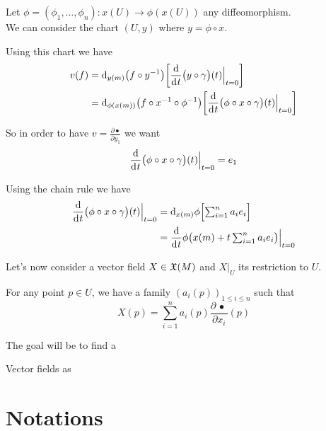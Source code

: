 		Let $\phi = (\phi_1, \ldots, \phi_n): x(U) \to \phi(x(U))$ any diffeomorphism.\\
		We can consider the chart $(U, y)$ where $y = \phi \circ x$.

		Using this chart we have
		\begin{align*}
			v(f) &= \di[y(m)] \big( f \circ y^{-1} \big) \bigg[ \frac{\d}{\di{t}} \big( y \circ \gamma \big)(t) \Big|_{t=0} \bigg] \\
			     &= \di[\phi(x(m))] \big( f \circ x^{-1} \circ \phi^{-1} \big) \bigg[ \frac{\d}{\di{t}} \big( \phi \circ x \circ \gamma \big)(t) \Big|_{t=0} \bigg]
		\end{align*}

		So in order to have $v = \frac{\partial{\bullet}}{\partial{y_1}}$ we want
		$$
			\frac{\d}{\di{t}} \big( \phi \circ x \circ \gamma \big)(t) \Big|_{t=0} = e_1
		$$

		Using the chain rule we have
		\begin{align*}
			\frac{\d}{\di{t}} \big( \phi \circ x \circ \gamma \big)(t) \Big|_{t=0} &= \di[x(m)]{\phi} \Big[ {\textstyle\sum_{i=1}^n a_i e_i} \Big] \\
			                                                                       &= \frac{\d}{\di{t}} \phi\big( x(m) + {\textstyle t \sum_{i=1}^n a_i e_i} \big) \Big|_{t=0}
		\end{align*}

		Let's now consider a vector field $X \in \mathfrak{X}(M)$ and $X|_U$ its restriction to $U$.

		For any point $p \in U$, we have a family $(a_i(p))_{1 \leq i \leq n}$ such that
		$$
			X(p) = \sum_{i=1}^n a_i(p) \frac{\partial \,\bullet\,}{\partial{x_i}}(p)
		$$

		The goal will be to find a 

		Vector fields as 

\section{Notations}

